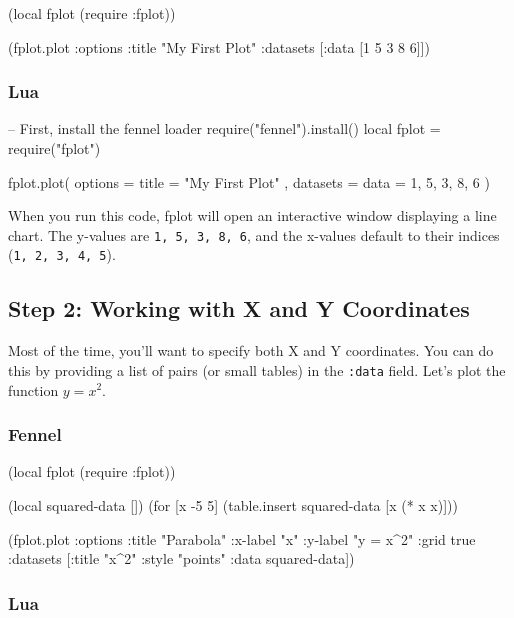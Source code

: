 \documentclass[12pt, letterpaper]{article}
\begin{document}
	\begin{fennelcode}
(local fplot (require :fplot))

(fplot.plot
{:options {:title "My First Plot"}
	:datasets [{:data [1 5 3 8 6]}]})
	\end{fennelcode}
	
	\subsubsection*{Lua}
	
	\begin{luacode}
-- First, install the fennel loader
require("fennel").install()
local fplot = require("fplot")

fplot.plot({
	options = { title = "My First Plot" },
	datasets = {
		{ data = {1, 5, 3, 8, 6} }
	}
})
	\end{luacode}
	
	When you run this code, fplot will open an interactive window displaying a line chart. The y-values are \texttt{1, 5, 3, 8, 6}, and the x-values default to their indices (\texttt{1, 2, 3, 4, 5}).
	
	\subsection{Step 2: Working with X and Y Coordinates}
	
	Most of the time, you'll want to specify both X and Y coordinates. You can do this by providing a list of pairs (or small tables) in the \texttt{:data} field. Let's plot the function $y = x^2$.
	
	\subsubsection*{Fennel}
	
	\begin{fennelcode}
(local fplot (require :fplot))

(local squared-data [])
(for [x -5 5]
(table.insert squared-data [x (* x x)]))

(fplot.plot
{:options {:title "Parabola"
		:x-label "x"
		:y-label "y = x^2"
		:grid true}
	:datasets [{:title "x^2"
		:style "points"
		:data squared-data}]})
	\end{fennelcode}
	
	\subsubsection*{Lua}
	
\end{document}
